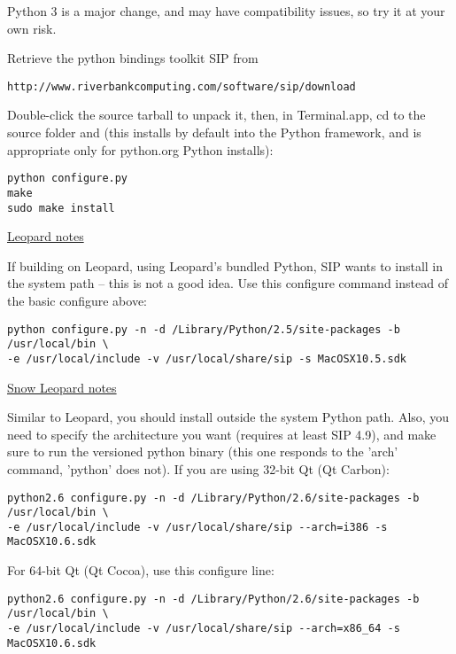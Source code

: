 Python 3 is a major change, and may have compatibility issues, so try it at your own risk.

Retrieve the python bindings toolkit SIP from

\begin{verbatim}
http://www.riverbankcomputing.com/software/sip/download
\end{verbatim}

Double-click the source tarball to unpack it, then, in Terminal.app, cd to the source folder
and (this installs by default into the Python framework, and is appropriate only for 
python.org Python installs):

\begin{verbatim}
python configure.py 
make 
sudo make install 
\end{verbatim}

\underline{Leopard notes}

If building on Leopard, using Leopard's bundled Python, SIP wants to install in the
system path -- this is not a good idea.  Use this configure command instead of the 
basic configure above:

\begin{verbatim}
python configure.py -n -d /Library/Python/2.5/site-packages -b /usr/local/bin \
-e /usr/local/include -v /usr/local/share/sip -s MacOSX10.5.sdk
\end{verbatim}

\underline{Snow Leopard notes}

Similar to Leopard, you should install outside the system Python path.
Also, you need to specify the architecture you want (requires at least SIP 4.9),
and make sure to run the versioned python binary (this one responds to the
'arch' command, 'python' does not). If you are using 32-bit Qt (Qt Carbon):

\begin{verbatim}
python2.6 configure.py -n -d /Library/Python/2.6/site-packages -b /usr/local/bin \
-e /usr/local/include -v /usr/local/share/sip --arch=i386 -s MacOSX10.6.sdk
\end{verbatim}

For 64-bit Qt (Qt Cocoa), use this configure line:

\begin{verbatim}
python2.6 configure.py -n -d /Library/Python/2.6/site-packages -b /usr/local/bin \
-e /usr/local/include -v /usr/local/share/sip --arch=x86_64 -s MacOSX10.6.sdk
\end{verbatim}

